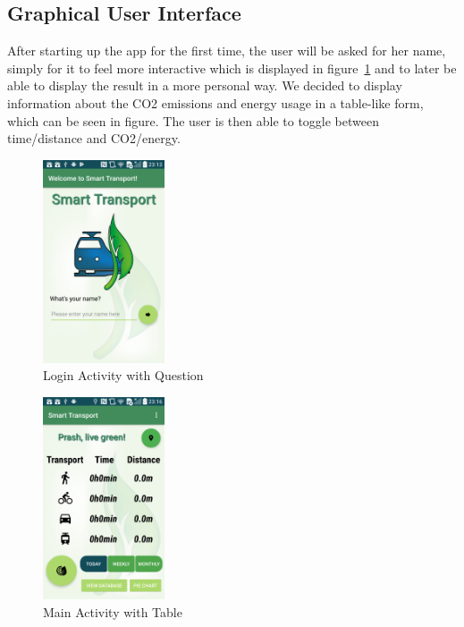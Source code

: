 \documentclass[10pt,conference,compsocconf]{IEEEtran}
\begin{document}
\subsection{Graphical User Interface}

After starting up the app for the first time, the user will be asked for her name, simply for it to feel more interactive which is displayed in figure~\ref{fig:login} and to later be able to display the result in a more personal way.
We decided to display information about the CO2 emissions and energy usage in a table-like form, which can be seen in figure. The user is then able to toggle between time/distance and CO2/energy.

\begin{figure}[h]
	\centering
	\includegraphics[width=\columnwidth, height=6cm, keepaspectratio]{ressources/LoginActivity.png}
	\vspace{0em} %
	\caption{Login Activity with Question}
	\label{fig:login}
\end{figure}

\begin{figure}[h]
	\centering
	\includegraphics[width=\columnwidth, height=6cm, keepaspectratio]{ressources/MainActivityOn.png}
	\vspace{0em} %
	\caption{Main Activity with Table}
	\label{fig:main}
\end{figure}
\end{document}
